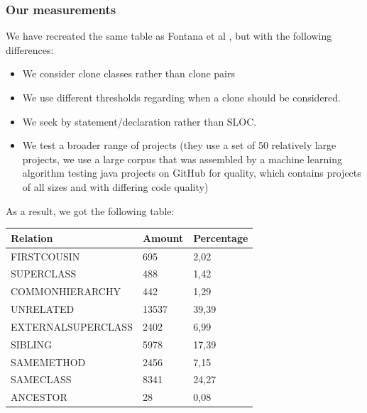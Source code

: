 \documentclass[a4paper]{article}
\begin{document}
\subsubsection{Our measurements}
We have recreated the same table as Fontana et al \cite{fontana2015duplicated}, but with the following differences:
\begin{itemize}
  \item We consider clone classes rather than clone pairs
\item We use different thresholds regarding when a clone should be considered.
\item We seek by statement/declaration rather than SLOC.
\item We test a broader range of projects (they use a set of 50 relatively large projects, we use a large corpus that was assembled by a machine learning algorithm testing java projects on GitHub for quality, which contains projects of all sizes and with differing code quality)
\end{itemize}

As a result, we got the following table:

\begin{table}[H]
\begin{tabular}{|l|l|l|}
\textbf{Relation}  & \textbf{Amount} & \textbf{Percentage} \\ \hline
FIRSTCOUSIN        & 695             & 2,02                \\ \hline
SUPERCLASS         & 488             & 1,42                \\ \hline
COMMONHIERARCHY    & 442             & 1,29                \\ \hline
UNRELATED          & 13537           & 39,39               \\ \hline
EXTERNALSUPERCLASS & 2402            & 6,99                \\ \hline
SIBLING            & 5978            & 17,39               \\ \hline
SAMEMETHOD         & 2456            & 7,15                \\ \hline
SAMECLASS          & 8341            & 24,27               \\ \hline
ANCESTOR           & 28              & 0,08               \\ \hline
\end{tabular}
\end{table}

\end{document}
